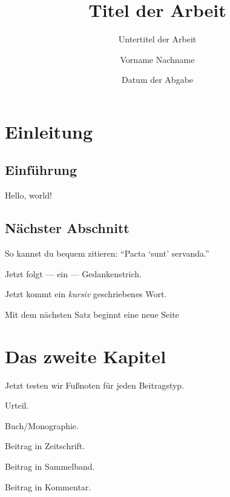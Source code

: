 \documentclass[12pt, oneside, openany]{scrreprt}
\begin{document}
\title{Titel der Arbeit}
\subtitle{Untertitel der Arbeit}
\author{Vorname Nachname}
\date{Datum der Abgabe}

\maketitle

\setcounter{tocdepth}{6}
\tableofcontents

\chapter{Einleitung}

\section{Einführung}
Hello, world!

\section{Nächster Abschnitt}

So kannst du bequem zitieren: \enquote{Pacta \enquote{sunt} servanda.}

Jetzt folgt --- ein --- Gedankenstrich.

Jetzt kommt ein \emph{kursiv} geschriebenes Wort.

Mit dem nächsten Satz beginnt eine neue Seite \newpage



\chapter{Das zweite Kapitel}

Jetzt testen wir Fußnoten für jeden Beitragstyp.

Urteil.\cite[prefix = {}, suffix = {.}]{UrteilVom160520132013}

Buch/Monographie.\cite[prefix = {}, suffix = {.}, page = 23]{buscheVerwaltungsautomation20Automatisiert2023}

Beitrag in Zeitschrift.\cite[prefix = {}, suffix = {.}, page = 750]{martiniOnceOnlyOnly2017}

Beitrag in Sammelband.\cite[prefix = {}, suffix = {.}, page = 199]{druenAmtsermittlungsgrundsatzUndRisikomanagement2019a}

Beitrag in Kommentar.\cite[prefix = {}, suffix = { Rn. 88.}]{klein882024} \cite[prefix = {}, suffix = {Rn. 102.}]{difabioArt22025}
\end{document}
